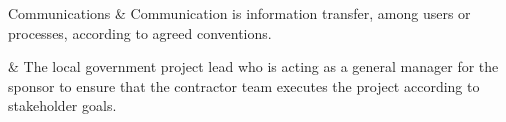 

Communications		&	\KNEADglossaryEntryStart
{
Communication is information transfer, among users or processes, according to agreed conventions.
}\KNEADglossaryEntryClose

\Customer         & \KNEADglossaryEntryStart
{
The local government project lead who is acting as a general manager for the sponsor to ensure that the contractor team executes the project according to stakeholder goals.
}\KNEADglossaryEntryCloseLast

